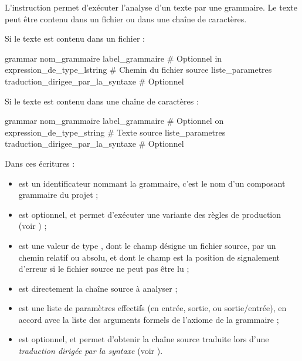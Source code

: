 {{

L'instruction  permet d'exécuter l'analyse d'un texte par une grammaire. Le texte peut être contenu dans un fichier ou dans une chaîne de caractères.

Si le texte est contenu dans un fichier :
\begin{galgascode}
grammar
  nom_grammaire
  label_grammaire # Optionnel
  in expression_de_type_lstring # Chemin du fichier source
  liste_parametres
  traduction_dirigee_par_la_syntaxe # Optionnel
\end{galgascode}

Si le texte est contenu dans une chaîne de caractères :
\begin{galgascode}
grammar
  nom_grammaire
  label_grammaire # Optionnel
  on expression_de_type_string # Texte source
  liste_parametres
  traduction_dirigee_par_la_syntaxe # Optionnel
\end{galgascode}

Dans ces écritures :
\begin{itemize}
  \item {} est un identificateur nommant la grammaire, c'est le nom d'un composant grammaire du projet ;
  \item {} est optionnel, et permet d'exécuter une variante des règles de production (voir ) ;
  \item {} est une valeur de type , dont le champ  désigne un fichier source, par un chemin relatif ou absolu, et dont le champ  est la position de signalement d'erreur si le fichier source ne peut pas être lu ;
  \item {} est directement la chaîne source à analyser ;
  \item {} est une liste de paramètres effectifs (en entrée, sortie, ou sortie/entrée), en accord avec la liste des arguments formels de l'axiome de la grammaire ;
  \item {} est optionnel, et permet d'obtenir la chaîne source traduite lors d'une \emph{traduction dirigée par la syntaxe} (voir ).
\end{itemize}


}}
